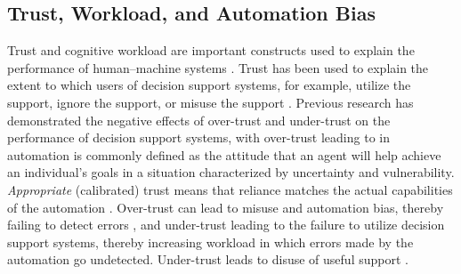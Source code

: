 \documentclass[journal]{IEEEtran}
\theoremstyle{plain}
\theoremstyle{definition}
\providecommand{\DIFaddtex}[1]{{\protect\color{blue} \sf #1}} %
\providecommand{\DIFdeltex}[1]{{\protect\color{red} \scriptsize #1}} %
\providecommand{\DIFaddbegin}{} %
\providecommand{\DIFaddend}{} %
\providecommand{\DIFdelbegin}{} %
\providecommand{\DIFdelend}{} %
\providecommand{\DIFadd}[1]{\texorpdfstring{\DIFaddtex{#1}}{#1}} %
\providecommand{\DIFdel}[1]{\texorpdfstring{\DIFdeltex{#1}}{}} %
\newcommand{\DIFscaledelfig}{0.5}
\newlength{\DIFdelgraphicswidth} %
\newlength{\DIFdelgraphicsheight} %
\newcommand{\DIFaddincludegraphics}[2][]{{\color{blue}\fbox{\DIFOincludegraphics[#1]{#2}}}} %
\newcommand{\DIFdelincludegraphics}[2][]{%
\sbox{\DIFdelgraphicsbox}{\DIFOincludegraphics[#1]{#2}}%
\settoboxwidth{\DIFdelgraphicswidth}{\DIFdelgraphicsbox} %
\settoboxtotalheight{\DIFdelgraphicsheight}{\DIFdelgraphicsbox} %
\scalebox{\DIFscaledelfig}{%
\parbox[b]{\DIFdelgraphicswidth}{\usebox{\DIFdelgraphicsbox}\\[-\baselineskip] \rule{\DIFdelgraphicswidth}{0em}}\llap{\resizebox{\DIFdelgraphicswidth}{\DIFdelgraphicsheight}{%
\setlength{\unitlength}{\DIFdelgraphicswidth}%
\begin{picture}(1,1)%
\thicklines\linethickness{2pt} %
{\color[rgb]{1,0,0}\put(0,0){\framebox(1,1){}}}%
{\color[rgb]{1,0,0}\put(0,0){\line( 1,1){1}}}%
{\color[rgb]{1,0,0}\put(0,1){\line(1,-1){1}}}%
\end{picture}%
}\hspace*{3pt}}} %
} %
\DeclareRobustCommand{\DIFaddbegin}{\DIFOaddbegin \let\includegraphics\DIFaddincludegraphics} %
\DeclareRobustCommand{\DIFaddend}{\DIFOaddend \let\includegraphics\DIFOincludegraphics} %
\DeclareRobustCommand{\DIFdelbegin}{\DIFOdelbegin \let\includegraphics\DIFdelincludegraphics} %
\DeclareRobustCommand{\DIFdelend}{\DIFOaddend \let\includegraphics\DIFOincludegraphics} %
\begin{document}
\subsection{Trust, Workload, and Automation Bias}
Trust and cognitive workload are important constructs used to explain the performance of human--machine systems \cite{Hodgson2013THMS,Bach2024Access}. Trust \DIFdelbegin \DIFdel{has been used to explain the extent to which users of decision support systems, for example, utilize the support, ignore the support, or misuse the support \cite{Lai2023FAccT,Yang2022THMSReview}. Previous research has demonstrated the negative effects of over-trust and under-trust on the performance of decision support systems, with over-trust leading to }\DIFdelend \DIFaddbegin \DIFadd{in automation is commonly defined as the attitude that an agent will help achieve an individual's goals in a situation characterized by uncertainty and vulnerability. \emph{Appropriate} (calibrated) trust means that reliance matches the actual capabilities of the automation \cite{Lee2004}. Over-trust can lead to misuse and }\DIFaddend automation bias, \DIFdelbegin \DIFdel{thereby failing to detect errors , and under-trust leading to the failure to utilize decision support systems, thereby increasing workload \cite{Raji2019AIES,Raji2022CACM}}\DIFdelend \DIFaddbegin \DIFadd{in which errors made by the automation go undetected. Under-trust leads to disuse of useful support \cite{Lee2004,Parasuraman2010,Raji2019AIES,Raji2022CACM}}\DIFaddend .
\end{document}
